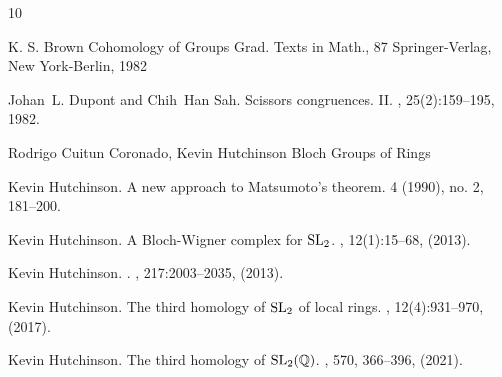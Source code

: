 \documentclass[12pt]{amsart}
\theoremstyle{definition}
\newcommand{\<}{\langle}
\renewcommand{\>}{\rangle}
\begin{document}
\begin{thebibliography}{10}


K. S. Brown
\newblock Cohomology of Groups
\newblock Grad. Texts in Math., 87
\newblock Springer-Verlag, New York-Berlin, 1982

Johan~L. Dupont and Chih~Han Sah.
\newblock Scissors congruences. {II}.
, 25(2):159--195, 1982.






Rodrigo Cuitun Coronado, Kevin Hutchinson
\newblock  Bloch Groups of Rings


   

Kevin Hutchinson.
\newblock A new approach to Matsumoto's theorem.
 4 (1990), no. 2, 181–200.




Kevin Hutchinson.
\newblock A {B}loch-{W}igner complex for {$\mathrm{SL}\sb 2$}.
, 12(1):15--68, (2013).

Kevin Hutchinson.
.
, 217:2003--2035, (2013).


Kevin Hutchinson.
\newblock The third homology of {${\rm SL}_2$} of local rings.
, 12(4):931--970, (2017).

Kevin Hutchinson.
\newblock The third homology of {${\rm SL}_2(\Bbb Q)$}.
, 570, 366--396, (2021).


\end{thebibliography}
\end{document}
